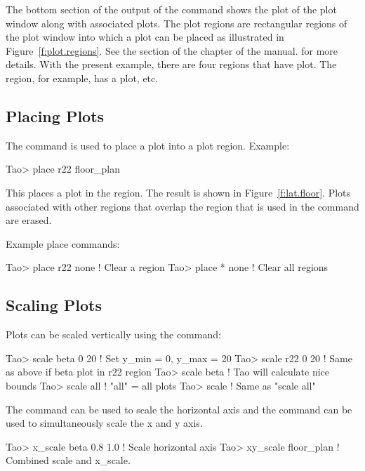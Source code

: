 \documentclass{hitec}
\begin{document}
The bottom section of the output of the  command shows the plot  of the
plot window along with associated plots. The plot regions are rectangular regions of the plot window
into which a plot can be placed as illustrated in Figure~\ref{f:plot.regions}.  See the
 section of the  chapter of the \tao manual. for
more details. With the present example, there are four regions that have plot. The  region,
for example, has a  plot, etc.


\subsection{Placing Plots}

The  command is used to place a  plot into a plot region. Example:
\begin{code}
Tao> place r22 floor_plan
\end{code}
This places a  plot in the  region.
The result is shown in Figure~\ref{f:lat.floor}. Plots associated with other regions
that overlap the region that is used in the  command are erased. 

Example place commands:
\begin{code}
Tao> place r22 none    ! Clear a region
Tao> place * none      ! Clear all regions
\end{code}

\subsection{Scaling Plots}

Plots can be scaled vertically using the  command:
\begin{code}
Tao> scale beta 0 20  ! Set y_min = 0, y_max = 20
Tao> scale r22 0 20   ! Same as above if beta plot in r22 region
Tao> scale beta       ! Tao will calculate nice bounds
Tao> scale all        ! "all" = all plots
Tao> scale            ! Same as "scale all"
\end{code}

The  command can be used to scale the horizontal axis and
the  command can be used to simultaneously scale the x and y axis.
\begin{code}
Tao> x_scale beta 0.8 1.0   ! Scale horizontal axis
Tao> xy_scale floor_plan    ! Combined scale and x_scale.
\end{code}
\end{document}
